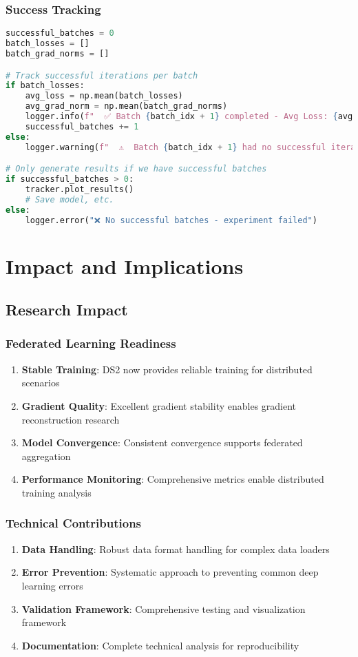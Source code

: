 \documentclass[11pt,a4paper]{article}
\begin{document}
\subsubsection{Success Tracking}
\begin{lstlisting}[language=Python, caption=Comprehensive Success Tracking]
successful_batches = 0
batch_losses = []
batch_grad_norms = []

# Track successful iterations per batch
if batch_losses:
    avg_loss = np.mean(batch_losses)
    avg_grad_norm = np.mean(batch_grad_norms)
    logger.info(f"  ✅ Batch {batch_idx + 1} completed - Avg Loss: {avg_loss:.6f}")
    successful_batches += 1
else:
    logger.warning(f"  ⚠️  Batch {batch_idx + 1} had no successful iterations")

# Only generate results if we have successful batches
if successful_batches > 0:
    tracker.plot_results()
    # Save model, etc.
else:
    logger.error("❌ No successful batches - experiment failed")
\end{lstlisting}

\section{Impact and Implications}

\subsection{Research Impact}

\subsubsection{Federated Learning Readiness}
\begin{enumerate}
    \item \textbf{Stable Training}: DS2 now provides reliable training for distributed scenarios
    \item \textbf{Gradient Quality}: Excellent gradient stability enables gradient reconstruction research
    \item \textbf{Model Convergence}: Consistent convergence supports federated aggregation
    \item \textbf{Performance Monitoring}: Comprehensive metrics enable distributed training analysis
\end{enumerate}

\subsubsection{Technical Contributions}
\begin{enumerate}
    \item \textbf{Data Handling}: Robust data format handling for complex data loaders
    \item \textbf{Error Prevention}: Systematic approach to preventing common deep learning errors
    \item \textbf{Validation Framework}: Comprehensive testing and visualization framework
    \item \textbf{Documentation}: Complete technical analysis for reproducibility
\end{enumerate}
\end{document}
